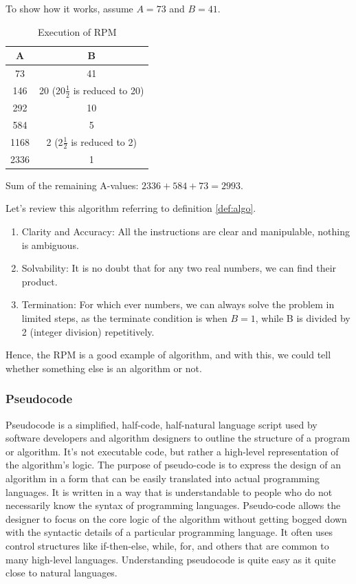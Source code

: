     To show how it works, assume $A=73$ and $B=41$.

\begin{table}[H]
\centering
\begin{tabular}{c|c}
\hline
A & B \\
\hline
73 & 41 \\
146 & 20 (20\(\frac{1}{2}\) is reduced to 20) \\
292 & 10 \\
584 & 5 \\
1168 & 2 (2\(\frac{1}{2}\) is reduced to 2) \\
2336 & 1 \\
\hline
\end{tabular}
\caption{Execution of RPM}
\end{table}

Sum of the remaining A-values: $2336+584+73=2993$.

Let's review this algorithm referring to definition \autoref{def:algo}. 
\begin{enumerate}
    \item Clarity and Accuracy: All the instructions are clear and manipulable, nothing is ambiguous.
    
    \item Solvability: It is no doubt that for any two real numbers, we can find their product.
    
    \item Termination: For which ever numbers, we can always solve the problem in limited steps, as the terminate condition is when $B=1$, while B is divided by 2 (integer division) repetitively. 
\end{enumerate}

Hence, the RPM is a good example of algorithm, and with this, we could tell whether
something else is an algorithm or not.
\subsubsection{Pseudocode}
Pseudocode is a simplified, half-code, half-natural language script used by software developers and algorithm designers to outline the structure of a program or algorithm. It's not executable code, but rather a high-level representation of the algorithm's logic. The purpose of pseudo-code is to express the design of an algorithm in a form that can be easily translated into actual programming languages. It is written in a way that is understandable to people who do not necessarily know the syntax of programming languages. Pseudo-code allows the designer to focus on the core logic of the algorithm without getting bogged down with the syntactic details of a particular programming language. It often uses control structures like if-then-else, while, for, and others that are common to many high-level languages.
Understanding pseudocode is quite easy as it quite close to natural languages.

